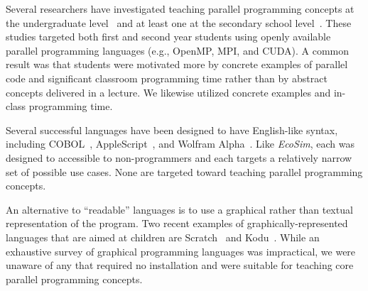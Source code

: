 \documentclass{sig-alternate}
\newcommand{\EcoSim}{\emph{EcoSim}}
\begin{document}
Several researchers have investigated teaching parallel programming concepts 
at the undergraduate level~\cite{freshmanParallel,undergraduateParallel,gridPortal} 
and at least one at the secondary school level~\cite{highSchoolParallel}.
These studies targeted both first and second year students
using openly available parallel programming languages (e.g., OpenMP, MPI, and CUDA).
A common result was that students were motivated more by 
concrete examples of parallel code and significant classroom programming time 
rather than by abstract concepts delivered in a lecture.
We likewise utilized concrete examples and in-class programming time.


Several successful languages have been designed to have English-like syntax,
including COBOL~\cite{COBOL59}, AppleScript~\cite{AppleScript}, and Wolfram Alpha~\cite{WolframAlpha}.
Like \EcoSim{}, each was designed to accessible to non-programmers
and each targets a relatively narrow set of possible use cases.
None are targeted toward teaching parallel programming concepts.

An alternative to ``readable'' languages 
is to use a graphical rather than textual representation of the program.
Two recent examples of graphically-represented languages that are aimed at children 
are Scratch~\cite{Scratch} and Kodu~\cite{Kodu}.
While an exhaustive survey of graphical programming languages was impractical,
we were unaware of any that required no installation
and were suitable for teaching core parallel programming concepts.
\end{document}
